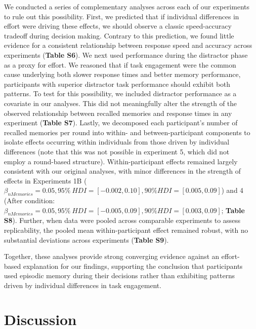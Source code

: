 \documentclass[10pt,letterpaper]{article}
\begin{document}
We conducted a series of complementary analyses across each of our experiments to rule out this possibility. First, we predicted that if individual differences in effort were driving these effects, we should observe a classic speed-accuracy tradeoff during decision making. Contrary to this prediction, we found little evidence for a consistent relationship between response speed and accuracy across experiments (\textbf{Table S6}). We next used performance during the distractor phase as a proxy for effort. We reasoned that if task engagement were the common cause underlying both slower response times and better memory performance, participants with superior distractor task performance should exhibit both patterns. To test for this possibility, we included distractor performance as a covariate in our analyses. This did not meaningfully alter the strength of the observed relationship between recalled memories and response times in any experiment (\textbf{Table S7}). Lastly, we decomposed each participant's number of recalled memories per round into within- and between-participant components to isolate effects occurring within individuals from those driven by individual differences (note that this was not possible in experiment 5, which did not employ a round-based structure). Within-participant effects remained largely consistent with our original analyses, with minor differences in the strength of effects in Experiments 1B ($\beta_{nMemories} = 0.05, 95\% \ HDI = [-0.002, 0.10], 90\% HDI=[0.005, 0.09]$) and 4 (After condition: $\beta_{nMemories} = 0.05, 95\% \ HDI = [-0.005, 0.09], 90\% HDI=[0.003, 0.09]$; \textbf{Table S8}). Further, when data were pooled across comparable experiments to assess replicability, the pooled mean within-participant effect remained robust, with no substantial deviations across experiments (\textbf{Table S9}).

Together, these analyses provide strong converging evidence against an effort-based explanation for our findings, supporting the conclusion that participants used episodic memory during their decisions rather than exhibiting patterns driven by individual differences in task engagement.

\section{Discussion}
\end{document}
